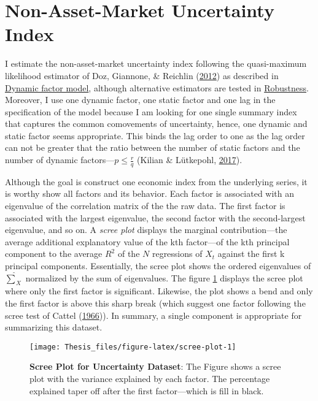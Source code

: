 \documentclass[12pt,twoside]{reedthesis}
\begin{document}
\hypertarget{non-asset-market-uncertainty-index}{%
\section{Non-Asset-Market Uncertainty Index}\label{non-asset-market-uncertainty-index}}

I estimate the non-asset-market uncertainty index following the quasi-maximum likelihood estimator of Doz, Giannone, \& Reichlin (\protect\hyperlink{ref-dozetal:2012}{2012}) as described in \protect\hyperlink{dynamic-factor-model}{Dynamic factor model}, although alternative estimators are tested in \protect\hyperlink{robustness}{Robustness}. Moreover, I use one dynamic factor, one static factor and one lag in the specification of the model because I am looking for one single summary index that captures the common comovements of uncertainty, hence, one dynamic and static factor seems appropriate. This binds the lag order to one as the lag order can not be greater that the ratio between the number of static factors and the number of dynamic factors---\(p \le \frac{r}{q}\) (Kilian \& Lütkepohl, \protect\hyperlink{ref-kililutk:2017}{2017}).

Although the goal is construct one economic index from the underlying series, it is worthy show all factors and its behavior. Each factor is associated with an eigenvalue of the correlation matrix of the the raw data. The first factor is associated with the largest eigenvalue, the second factor with the second-largest eigenvalue, and so on. A \emph{scree plot} displays the marginal contribution---the average additional explanatory value of the kth factor---of the kth principal component to the average \(R^{2}\) of the \(N\) regressions of \(X_{t}\) against the first k principal components. Essentially, the scree plot shows the ordered eigenvalues of \(\hat{\sum}_{X}\) normalized by the sum of eigenvalues. The figure \ref{fig:scree-plot} displays the scree plot where only the first factor is significant. Likewise, the plot shows a bend and only the first factor is above this sharp break (which suggest one factor following the scree test of Cattel (\protect\hyperlink{ref-cattel:1966}{1966})). In summary, a single component is appropriate for summarizing this dataset.


\begin{figure}

{\centering \texttt{[image: Thesis\_files/figure-latex/scree-plot-1]} 

}

\caption[Scree Plot for Uncertainty Dataset]{\textbf{Scree Plot for Uncertainty Dataset}: The Figure shows a scree plot with the variance explained by each factor. The percentage explained taper off after the first factor---which is fill in black.}\label{fig:scree-plot}
\end{figure}
\end{document}
